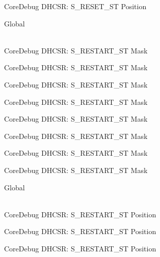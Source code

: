 \begin{DoxyRefList}
\label{deprecated__deprecated000562}%
%
Core\+Debug DHCSR\+: S\+\_\+\+RESET\+\_\+\+ST Position  
\item[{\parbox[t]{\linewidth}{Global \doxylink{group___c_m_s_i_s___s_c_b_gabe3254d40aaa482987ff31584d2a3240}{Core\+Debug\+\_\+\+DHCSR\+\_\+\+S\+\_\+\+RESTART\+\_\+\+ST\+\_\+\+Msk} }}]\hfill \\
\label{deprecated__deprecated000008}%
%
Core\+Debug DHCSR\+: S\+\_\+\+RESTART\+\_\+\+ST Mask 

\label{deprecated__deprecated000108}%
%
Core\+Debug DHCSR\+: S\+\_\+\+RESTART\+\_\+\+ST Mask 

\label{deprecated__deprecated000162}%
%
Core\+Debug DHCSR\+: S\+\_\+\+RESTART\+\_\+\+ST Mask 

\label{deprecated__deprecated000247}%
%
Core\+Debug DHCSR\+: S\+\_\+\+RESTART\+\_\+\+ST Mask 

\label{deprecated__deprecated000304}%
%
Core\+Debug DHCSR\+: S\+\_\+\+RESTART\+\_\+\+ST Mask 

\label{deprecated__deprecated000380}%
%
Core\+Debug DHCSR\+: S\+\_\+\+RESTART\+\_\+\+ST Mask 

\label{deprecated__deprecated000459}%
%
Core\+Debug DHCSR\+: S\+\_\+\+RESTART\+\_\+\+ST Mask 

\label{deprecated__deprecated000561}%
%
Core\+Debug DHCSR\+: S\+\_\+\+RESTART\+\_\+\+ST Mask  
\item[{\parbox[t]{\linewidth}{Global \doxylink{group___c_m_s_i_s___s_c_b_gaf6498d32dbe23b8d95a12d2fbc0a65f8}{Core\+Debug\+\_\+\+DHCSR\+\_\+\+S\+\_\+\+RESTART\+\_\+\+ST\+\_\+\+Pos} }}]\hfill \\
\label{deprecated__deprecated000007}%
%
Core\+Debug DHCSR\+: S\+\_\+\+RESTART\+\_\+\+ST Position 

\label{deprecated__deprecated000107}%
%
Core\+Debug DHCSR\+: S\+\_\+\+RESTART\+\_\+\+ST Position 

\label{deprecated__deprecated000161}%
%
Core\+Debug DHCSR\+: S\+\_\+\+RESTART\+\_\+\+ST Position 


\end{DoxyRefList}
